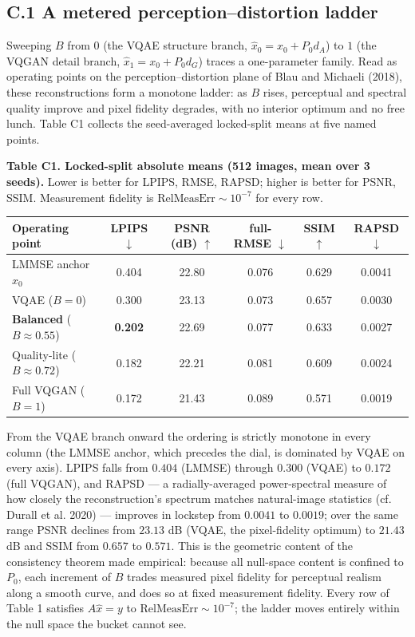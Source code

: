 \documentclass[11pt]{article}
\begin{document}
\subsection*{C.1 A metered perception--distortion ladder}

Sweeping $B$ from $0$ (the VQAE structure branch, $\hat{x}_0 = x_0 + P_0 d_A$) to $1$ (the VQGAN detail branch, $\hat{x}_1 = x_0 + P_0 d_G$) traces a one-parameter family. Read as operating points on the perception--distortion plane of Blau and Michaeli (2018), these reconstructions form a monotone ladder: as $B$ rises, perceptual and spectral quality improve and pixel fidelity degrades, with no interior optimum and no free lunch. Table C1 collects the seed-averaged locked-split means at five named points.

\textbf{Table C1. Locked-split absolute means (512 images, mean over 3 seeds).} Lower is better for LPIPS, RMSE, RAPSD; higher is better for PSNR, SSIM. Measurement fidelity is $\mathrm{RelMeasErr}\sim10^{-7}$ for every row.

\begin{center}\begin{tabular}{lccccc}
\toprule
Operating point & LPIPS $\downarrow$ & PSNR (dB) $\uparrow$ & full-RMSE $\downarrow$ & SSIM $\uparrow$ & RAPSD $\downarrow$ \\
\midrule
LMMSE anchor $x_0$ & 0.404 & 22.80 & 0.076 & 0.629 & 0.0041 \\
VQAE ($B=0$) & 0.300 & 23.13 & 0.073 & 0.657 & 0.0030 \\
\textbf{Balanced} ($B\!\approx\!0.55$) & \textbf{0.202} & 22.69 & 0.077 & 0.633 & 0.0027 \\
Quality-lite ($B\!\approx\!0.72$) & 0.182 & 22.21 & 0.081 & 0.609 & 0.0024 \\
Full VQGAN ($B=1$) & 0.172 & 21.43 & 0.089 & 0.571 & 0.0019 \\
\bottomrule
\end{tabular}\end{center}

From the VQAE branch onward the ordering is strictly monotone in every column (the LMMSE anchor, which precedes the dial, is dominated by VQAE on every axis). LPIPS falls from $0.404$ (LMMSE) through $0.300$ (VQAE) to $0.172$ (full VQGAN), and RAPSD --- a radially-averaged power-spectral measure of how closely the reconstruction's spectrum matches natural-image statistics (cf. Durall et al. 2020) --- improves in lockstep from $0.0041$ to $0.0019$; over the same range PSNR declines from $23.13$ dB (VQAE, the pixel-fidelity optimum) to $21.43$ dB and SSIM from $0.657$ to $0.571$. This is the geometric content of the consistency theorem made empirical: because all null-space content is confined to $P_0$, each increment of $B$ trades measured pixel fidelity for perceptual realism along a smooth curve, and does so at fixed measurement fidelity. Every row of Table 1 satisfies $A\hat{x} = y$ to $\mathrm{RelMeasErr}\sim10^{-7}$; the ladder moves entirely within the null space the bucket cannot see.
\end{document}
